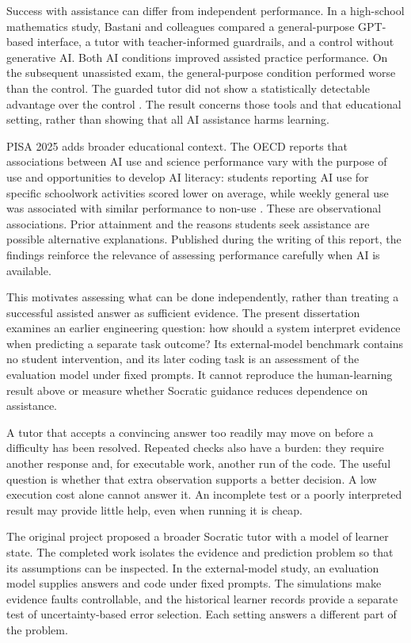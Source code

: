 Success with assistance can differ from independent performance. In a high-school mathematics study, Bastani and colleagues
compared a general-purpose GPT-based interface, a tutor with teacher-informed guardrails, and a control without generative AI.
Both AI conditions improved assisted practice performance. On the subsequent unassisted exam, the general-purpose condition
performed worse than the control. The guarded tutor did not show a statistically detectable advantage over the control
\parencite{bastani2025guardrails}. The result concerns those tools and that educational setting, rather than showing that all
AI assistance harms learning.

PISA 2025 adds broader educational context. The OECD reports that associations between AI use and science performance vary
with the purpose of use and opportunities to develop AI literacy: students reporting AI use for specific schoolwork activities
scored lower on average, while weekly general use was associated with similar performance to non-use
\parencite{oecd2026pisa2025}. These are observational associations. Prior attainment and the
reasons students seek assistance are possible alternative explanations. Published during the writing of this report, the
findings reinforce the relevance of assessing performance carefully when AI is available.

This motivates assessing what can be done independently, rather than treating a successful assisted answer as sufficient
evidence. The present dissertation examines an earlier engineering question: how should a system interpret evidence when
predicting a separate task outcome? Its external-model benchmark contains no student intervention, and its later coding task
is an assessment of the evaluation model under fixed prompts. It cannot reproduce the human-learning result above or measure
whether Socratic guidance reduces dependence on assistance.

A tutor that accepts a convincing answer too readily may move on before a difficulty has been resolved. Repeated checks also
have a burden: they require another response and, for executable work, another run of the code. The useful question is whether
that extra observation supports a better decision. A low execution cost alone cannot answer it. An incomplete test or a poorly
interpreted result may provide little help, even when running it is cheap.

The original project proposed a broader Socratic tutor with a model of learner state. The completed work isolates the evidence
and prediction problem so that its assumptions can be inspected. In the external-model study, an evaluation model supplies
answers and code under fixed prompts. The simulations make evidence faults controllable,
and the historical learner records provide a separate test of uncertainty-based error selection. Each setting answers a
different part of the problem.

